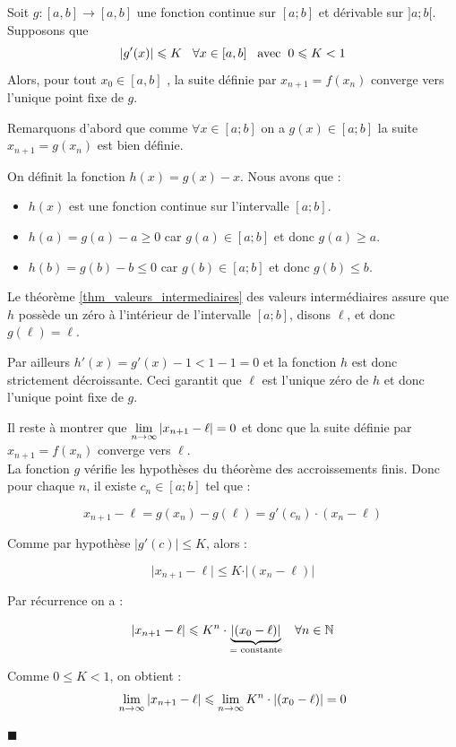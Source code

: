 \documentclass[11pt,a4paper,twoside,greek]{report}
\begin{document}

\begin{proposition}
\label{prop:existence_point_fixe}
Soit $g : [a, b] \rightarrow [a, b]$ une fonction continue sur $[a;b]$ et dérivable sur $]a;b[$.\\
Supposons que
$$\vert g^\prime(x)\vert \leqslant K \eh{3}\forall x \in [a, b] \eh{3} \textrm{avec}\eh{2} 0 \leqslant K < 1$$  
Alors, pour tout $x_0 \in [a, b]$ , la suite définie par
$x_{n+1} = f(x_n)$ converge vers l'unique point fixe de $g$.
\end{proposition}

\begin{demonstration}
Remarquons d'abord que comme $\forall x\in[a;b]$ on a $g(x)\in[a;b]$ la suite $x_{n+1}=g(x_n)$ est bien définie.

\medskip
On définit la fonction $h(x)=g(x)-x$. Nous avons que :

\begin{itemize}
\item $h(x)$ est une fonction continue sur l'intervalle $[a;b]$.
\item $h(a)=g(a)-a\geqslant 0$ car $g(a)\in[a;b]$ et donc $g(a)\geqslant a$.
\item $h(b)=g(b)-b\leqslant 0$ car $g(b)\in[a;b]$ et donc $g(b)\leqslant b$.
\end{itemize}

Le théorème \ref*{thm_valeurs_intermediaires} des valeurs intermédiaires assure que $h$ possède un zéro à l'intérieur de l'intervalle $[a;b]$, disons $\ell$, et donc $g(\ell)=\ell$.

\medskip
Par ailleurs $h'(x)=g'(x)-1< 1-1=0$ et la fonction $h$ est donc strictement décroissante. Ceci garantit que $\ell$ est l'unique zéro de $h$ et donc l'unique point fixe de $g$.

\medskip
Il reste à montrer que $\lin{\infty}\vert x_{n+1}-\ell\vert =0$ et donc que la suite définie par $x_{n+1} = f(x_n)$ converge vers $\ell$. \\
La fonction $g$ vérifie les hypothèses du théorème des accroissements finis. Donc pour chaque $n$, il existe $c_n\in [a;b]$ tel que :

$$x_{n+1}-\ell=g(x_{n})-g(\ell)=g'(c_n)\cdot (x_n-\ell)$$


\medskip
Comme par hypothèse $\vert g'(c)\vert\leqslant K$, alors :

$$\vert x_{n+1}-\ell\vert \leqslant K\cdot \vert (x_n-\ell) \vert$$

Par récurrence on a :

$$\vert x_{n+1}-\ell\vert \leqslant K^n\cdot \underbrace{\vert (x_0-\ell)\vert}_{=\textrm{ constante}}  \eh{3}\forall n\in\N$$


Comme $0\leqslant K< 1$, on obtient :
$$\lin{\infty}  \vert x_{n+1}-\ell\vert \leqslant \lin{\infty}K^n\cdot \vert (x_0-\ell)\vert=0$$

\vspace{-3mm}
\hfill $\blacksquare$
\end{demonstration}
\end{document}
